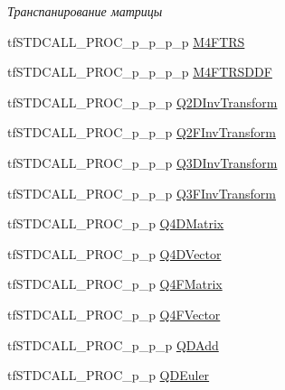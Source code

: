 \begin{DoxyCompactItemize}
\begin{DoxyCompactList}\small\item\em Транспанирование матрицы \end{DoxyCompactList}\item 
tf\-S\-T\-D\-C\-A\-L\-L\-\_\-\-P\-R\-O\-C\-\_\-p\-\_\-p\-\_\-p\-\_\-p \hyperlink{structs_functions_vector_c_p_u_a40908e85a7b7dd37d4ed207019da2e03}{M4\-F\-T\-R\-S}
\item 
tf\-S\-T\-D\-C\-A\-L\-L\-\_\-\-P\-R\-O\-C\-\_\-p\-\_\-p\-\_\-p\-\_\-p \hyperlink{structs_functions_vector_c_p_u_ac77f08ba18ab448756fd7d6426cd7867}{M4\-F\-T\-R\-S\-D\-D\-F}
\item 
tf\-S\-T\-D\-C\-A\-L\-L\-\_\-\-P\-R\-O\-C\-\_\-p\-\_\-p\-\_\-p \hyperlink{structs_functions_vector_c_p_u_abe2224b6fb2668caf7afaedff5aa9b85}{Q2\-D\-Inv\-Transform}
\item 
tf\-S\-T\-D\-C\-A\-L\-L\-\_\-\-P\-R\-O\-C\-\_\-p\-\_\-p\-\_\-p \hyperlink{structs_functions_vector_c_p_u_a96964aacaf05a743df1e3670a784c211}{Q2\-F\-Inv\-Transform}
\item 
tf\-S\-T\-D\-C\-A\-L\-L\-\_\-\-P\-R\-O\-C\-\_\-p\-\_\-p\-\_\-p \hyperlink{structs_functions_vector_c_p_u_aa1440ab66dae0a43331af3d2e224a230}{Q3\-D\-Inv\-Transform}
\item 
tf\-S\-T\-D\-C\-A\-L\-L\-\_\-\-P\-R\-O\-C\-\_\-p\-\_\-p\-\_\-p \hyperlink{structs_functions_vector_c_p_u_aed0952f2a75069681ca5d5d3b12ad346}{Q3\-F\-Inv\-Transform}
\item 
tf\-S\-T\-D\-C\-A\-L\-L\-\_\-\-P\-R\-O\-C\-\_\-p\-\_\-p \hyperlink{structs_functions_vector_c_p_u_a27c0998f650d915ff3f18cf0f00c09fe}{Q4\-D\-Matrix}
\item 
tf\-S\-T\-D\-C\-A\-L\-L\-\_\-\-P\-R\-O\-C\-\_\-p\-\_\-p \hyperlink{structs_functions_vector_c_p_u_af8abbbb8bf5ff6a48a6495aeb31f1a62}{Q4\-D\-Vector}
\item 
tf\-S\-T\-D\-C\-A\-L\-L\-\_\-\-P\-R\-O\-C\-\_\-p\-\_\-p \hyperlink{structs_functions_vector_c_p_u_ad15f5e9ee8c1759f5608a35763a4e353}{Q4\-F\-Matrix}
\item 
tf\-S\-T\-D\-C\-A\-L\-L\-\_\-\-P\-R\-O\-C\-\_\-p\-\_\-p \hyperlink{structs_functions_vector_c_p_u_a036490b371ba7fa72c98fea7bdedfc63}{Q4\-F\-Vector}
\item 
tf\-S\-T\-D\-C\-A\-L\-L\-\_\-\-P\-R\-O\-C\-\_\-p\-\_\-p\-\_\-p \hyperlink{structs_functions_vector_c_p_u_ae56047eef24bb5dc61e41fc89ed32244}{Q\-D\-Add}
\item 
tf\-S\-T\-D\-C\-A\-L\-L\-\_\-\-P\-R\-O\-C\-\_\-p\-\_\-p \hyperlink{structs_functions_vector_c_p_u_a57502a2026892e8995b3d042697e0aa4}{Q\-D\-Euler}

\end{DoxyCompactItemize}
